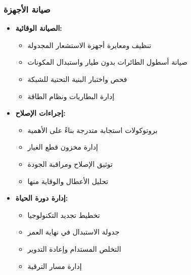 \subsubsection{صيانة الأجهزة}
\begin{itemize}
    \item \textbf{الصيانة الوقائية:}
    \begin{itemize}
        \item تنظيف ومعايرة أجهزة الاستشعار المجدولة
        \item صيانة أسطول الطائرات بدون طيار واستبدال المكونات
        \item فحص واختبار البنية التحتية للشبكة
        \item إدارة البطاريات ونظام الطاقة
    \end{itemize}
    
    \item \textbf{إجراءات الإصلاح:}
    \begin{itemize}
        \item بروتوكولات استجابة متدرجة بناءً على الأهمية
        \item إدارة مخزون قطع الغيار
        \item توثيق الإصلاح ومراقبة الجودة
        \item تحليل الأعطال والوقاية منها
    \end{itemize}
    
    \item \textbf{إدارة دورة الحياة:}
    \begin{itemize}
        \item تخطيط تجديد التكنولوجيا
        \item جدولة الاستبدال في نهاية العمر
        \item التخلص المستدام وإعادة التدوير
        \item إدارة مسار الترقية
    \end{itemize}
\end{itemize}

